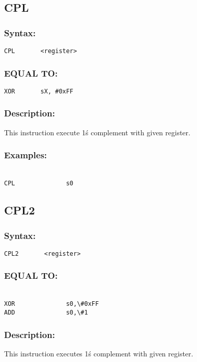     \subsection{CPL}
        \subsubsection{Syntax:}
            \verb'CPL       <register>'

        \subsubsection{EQUAL TO:}
            \verb'XOR       sX, #0xFF'

        \subsubsection{Description:}
            This instruction execute 1\'s complement with given register.

        \subsubsection{Examples:}
        {
            ~\\
            \usecodefont
            \verb'CPL              s0'\\
        }

    \subsection{CPL2}
        \subsubsection{Syntax:}
            \verb'CPL2       <register>'

        \subsubsection{EQUAL TO:}
        {
            ~\\
            \usecodefont
            \verb'XOR              s0,\#0xFF'\\
            \verb'ADD              s0,\#1'\\
        }
        \subsubsection{Description:}
            This instruction executes 1\'s complement with given register.

